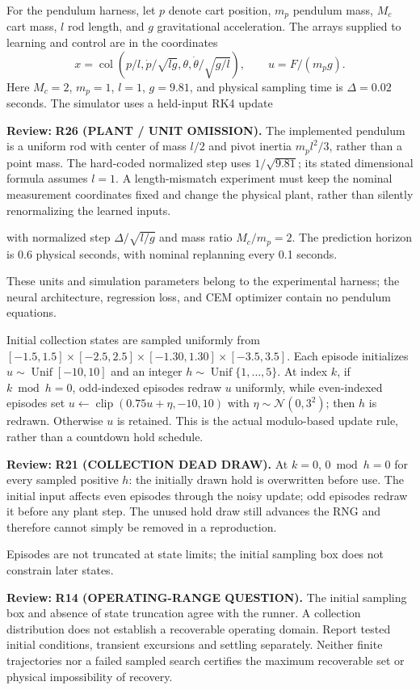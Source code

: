 \documentclass[11pt]{article}
\newcommand{\col}{\operatorname{col}}
\newcommand{\clip}{\operatorname{clip}}
\newcommand{\review}[1]{\par\noindent\textcolor{red!70!black}{\textbf{Review:} #1}\par}
\begin{document}
For the pendulum harness, let $p$ denote cart position, $m_p$ pendulum mass, $M_c$ cart mass, $l$ rod length, and $g$ gravitational acceleration. The arrays supplied to learning and control are in the coordinates
\begin{equation}\label{eq:units}
x=\col\left(p/l,\dot p/\sqrt{lg},\theta,\dot\theta/\sqrt{g/l}\right),\qquad u=F/(m_p g).
\end{equation}
Here $M_c=2$, $m_p=1$, $l=1$, $g=9.81$, and physical sampling time is $\Delta=0.02$ seconds. The simulator uses a held-input RK4 update
\review{\textbf{R26 (PLANT / UNIT OMISSION).} The implemented pendulum is a uniform rod with center of mass $l/2$ and pivot inertia $m_p l^2/3$, rather than a point mass. The hard-coded normalized step uses $1/\sqrt{9.81}$; its stated dimensional formula assumes $l=1$. A length-mismatch experiment must keep the nominal measurement coordinates fixed and change the physical plant, rather than silently renormalizing the learned inputs.}
 with normalized step $\Delta/\sqrt{l/g}$ and mass ratio $M_c/m_p=2$. The prediction horizon is 0.6 physical seconds, with nominal replanning every 0.1 seconds.

These units and simulation parameters belong to the experimental harness; the neural architecture, regression loss, and CEM optimizer contain no pendulum equations.

Initial collection states are sampled uniformly from $[-1.5,1.5]\times[-2.5,2.5]\times[-1.30,1.30]\times[-3.5,3.5]$. Each episode initializes $u\sim\operatorname{Unif}[-10,10]$ and an integer $h\sim\operatorname{Unif}\{1,\ldots,5\}$. At index $k$, if $k\bmod h=0$, odd-indexed episodes redraw $u$ uniformly, while even-indexed episodes set $u\leftarrow\clip(0.75u+\eta,-10,10)$ with $\eta\sim\mathcal N(0,3^2)$; then $h$ is redrawn. Otherwise $u$ is retained. This is the actual modulo-based update rule, rather than a countdown hold schedule.
\review{\textbf{R21 (COLLECTION DEAD DRAW).} At $k=0$, $0\bmod h=0$ for every sampled positive $h$: the initially drawn hold is overwritten before use. The initial input affects even episodes through the noisy update; odd episodes redraw it before any plant step. The unused hold draw still advances the RNG and therefore cannot simply be removed in a reproduction.}
 Episodes are not truncated at state limits; the initial sampling box does not constrain later states.
\review{\textbf{R14 (OPERATING-RANGE QUESTION).} The initial sampling box and absence of state truncation agree with the runner. A collection distribution does not establish a recoverable operating domain. Report tested initial conditions, transient excursions and settling separately. Neither finite trajectories nor a failed sampled search certifies the maximum recoverable set or physical impossibility of recovery.}
\end{document}

